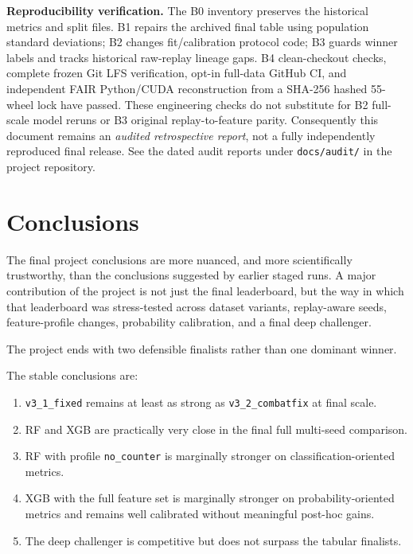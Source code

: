 \documentclass[11pt,a4paper]{article}
\begin{document}
\textbf{Reproducibility verification.}
The B0 inventory preserves the historical metrics and split files. B1
repairs the archived final table using population standard deviations;
B2 changes fit/calibration protocol code; B3 guards winner labels and
tracks historical raw-replay lineage gaps. B4 clean-checkout checks,
complete frozen Git LFS verification, opt-in full-data GitHub CI,
and independent FAIR Python/CUDA reconstruction from a SHA-256 hashed
55-wheel lock have passed. These engineering checks do not substitute
for B2 full-scale model reruns or B3 original replay-to-feature parity.
Consequently this document remains an \emph{audited retrospective
report}, not a fully independently reproduced final release. See the dated audit reports under
\texttt{docs/audit/} in the project repository.

\section{Conclusions}
The final project conclusions are more nuanced, and more scientifically trustworthy, than the conclusions suggested by earlier staged runs. A major contribution of the project is not just the final leaderboard, but the way in which that leaderboard was stress-tested across dataset variants, replay-aware seeds, feature-profile changes, probability calibration, and a final deep challenger.

\begin{resultbox}
The project ends with two defensible finalists rather than one dominant winner.
\end{resultbox}

The stable conclusions are:
\begin{enumerate}
    \item \texttt{v3\_1\_fixed} remains at least as strong as \texttt{v3\_2\_combatfix} at final scale.
    \item RF and XGB are practically very close in the final full multi-seed comparison.
    \item RF with profile \texttt{no\_counter} is marginally stronger on classification-oriented metrics.
    \item XGB with the full feature set is marginally stronger on probability-oriented metrics and remains well calibrated without meaningful post-hoc gains.
    \item The deep challenger is competitive but does not surpass the tabular finalists.
\end{enumerate}
\end{document}
